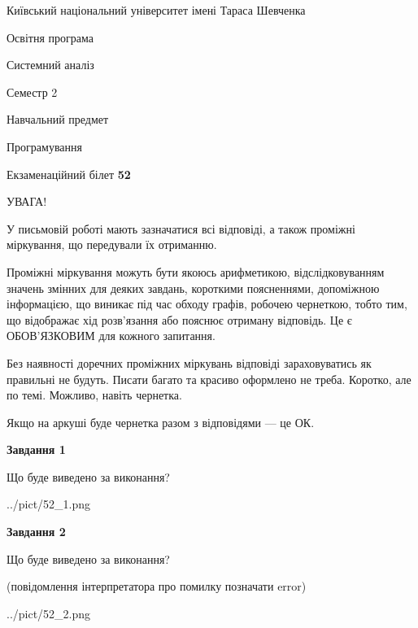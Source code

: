 \documentclass[12pt, ukrainian]{article}
\begin{document}
{{\begin {small}\par
{ \center  Київський національний університет імені Тараса Шевченка \par}
{\parbox {5 cm}{Освітня програма \hfill}{\parbox {7 cm}{Системний аналіз \hfill}}\parbox {6 cm}{\hfill Семестр 2}}\par
{\parbox {5 cm} {Навчальний предмет \hfill}\parbox {7 cm}{Програмування \hfill}\parbox {6cm}{\hfill}\par}\vspace{-7pt} \end{small}}{\center Екзаменаційний білет \No \textbf
{ 52 }\par}}
{
\begin {large}
УВАГА!

У письмовій роботі мають зазначатися всі відповіді, а також проміжні міркування, що передували їх отриманню.

Проміжні міркування можуть бути якоюсь арифметикою, відслідковуванням зна\-чень змінних для деяких завдань,
короткими поясненнями, допоміжною інформацією, що виникає під час обходу графів, робочею чернеткою,
тобто тим, що відображає хід розв’язання або пояснює отриману відповідь.
Це є ОБОВ’ЯЗКОВИМ для кожного запитання.

Без наявності доречних проміжних міркувань відповіді зараховуватись як правиль\-ні не будуть.
Писати багато та красиво оформлено не треба. Коротко, але по темі. Можли\-во, навіть чернетка.

Якщо на аркуші буде чернетка разом з відповідями --- це ОК.

\newpage

{\begin {center}\textbf{Завдання 1}\end {center}}\par
Що буде виведено за виконання?\par
\begin{center}
	{../pict/52_1.png}
\end{center}
\newpage

{\begin {center}\textbf{Завдання 2}\end {center}}\par
Що буде виведено за виконання?\par
 (повідомлення інтерпретатора про помилку позначати error)\par
\begin{center}
	{../pict/52_2.png}
\end{center}
\newpage


\end{large}}
\end{document}
